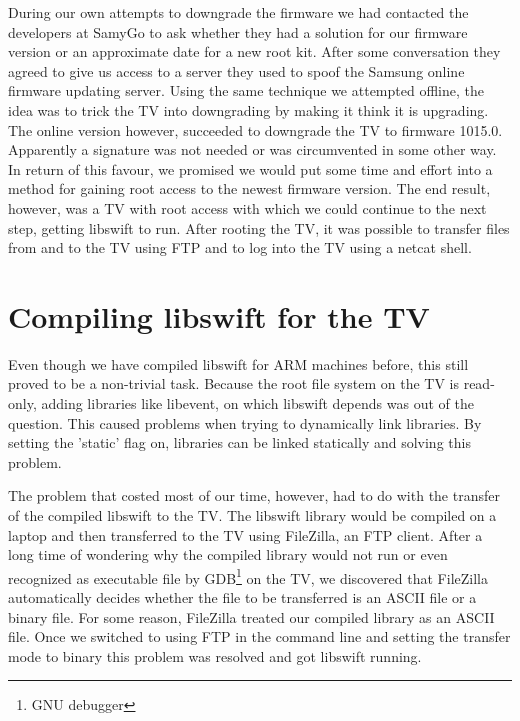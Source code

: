During our own attempts to downgrade the firmware we had contacted the developers at SamyGo to ask 
whether they had a solution for our firmware version or an approximate date for a new root kit.
After some conversation they agreed to give us access to a server they used to spoof the Samsung online firmware updating server.
Using the same technique we attempted offline, the idea was to trick the TV into downgrading by making it think it is upgrading.
The online version however, succeeded to downgrade the TV to firmware 1015.0.
Apparently a signature was not needed or was circumvented in some other way.
In return of this favour, we promised we would put some time and effort into a method for gaining root access to the newest firmware version.
The end result, however, was a TV with root access with which we could continue to the next step, getting libswift to run.
After rooting the TV, it was possible to transfer files from and to the TV using FTP and to log into the TV using a netcat shell.

\section{Compiling libswift for the TV}
Even though we have compiled libswift for ARM machines before, this still proved to be a non-trivial task.
Because the root file system on the TV is read-only, adding libraries like libevent, on which libswift depends was out of the question.
This caused problems when trying to dynamically link libraries.
By setting the 'static' flag on, libraries can be linked statically and solving this problem.

The problem that costed most of our time, however, 
had to do with the transfer of the compiled libswift to the TV.
The libswift library would be compiled on a laptop and then transferred to the TV using FileZilla, an FTP client.
After a long time of wondering why the compiled library would not run or even recognized as executable file by GDB\footnote{GNU debugger} on the TV,
we discovered that FileZilla automatically decides whether the file to be transferred is an ASCII file or a binary file.
For some reason, FileZilla treated our compiled library as an ASCII file.
Once we switched to using FTP in the command line and setting the transfer mode to binary this problem was resolved and got libswift running.

